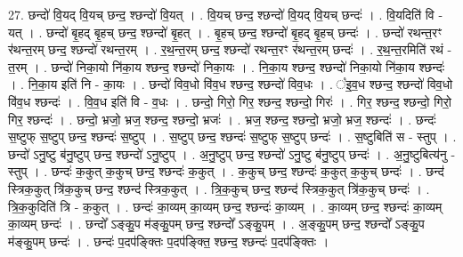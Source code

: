 \documentclass[17pt]{extarticle}
\begin{document}
27. छन्दो॑ वि॒यद् वि॒यच् छन्द॒ श्छन्दो॑ वि॒यत् । . वि॒यच् छन्द॒ श्छन्दो॑ वि॒यद् वि॒यच् छन्दः॑ । . वि॒यदिति॑ वि - यत् । . छन्दो॑ बृ॒हद् बृ॒हच् छन्द॒ श्छन्दो॑ बृ॒हत् । . बृ॒हच् छन्द॒ श्छन्दो॑ बृ॒हद् बृ॒हच् छन्दः॑ । . छन्दो॑ रथन्त॒रꣳ र॑थन्त॒रम् छन्द॒ श्छन्दो॑ रथन्त॒रम् । . र॒थ॒न्त॒रम् छन्द॒ श्छन्दो॑ रथन्त॒रꣳ र॑थन्त॒रम् छन्दः॑ । . र॒थ॒न्त॒रमिति॑ रथं - त॒रम् । . छन्दो॑ निका॒यो नि॑का॒य श्छन्द॒ श्छन्दो॑ निका॒यः । . नि॒का॒य श्छन्द॒ श्छन्दो॑ निका॒यो नि॑का॒य श्छन्दः॑ । . नि॒का॒य इति॑ नि - का॒यः । . छन्दो॑ विव॒धो वि॑व॒ध श्छन्द॒ श्छन्दो॑ विव॒धः । . ꣡इ॒व॒ध श्छन्द॒ श्छन्दो॑ विव॒धो वि॑व॒ध श्छन्दः॑ । . वि॒व॒ध इति॑ वि - व॒धः । . छन्दो॒ गिरो॒ गिर॒ श्छन्द॒ श्छन्दो॒ गिरः॑ । . गिर॒ श्छन्द॒ श्छन्दो॒ गिरो॒ गिर॒ श्छन्दः॑ । . छन्दो॒ भ्रजो॒ भ्रज॒ श्छन्द॒ श्छन्दो॒ भ्रजः॑ । . भ्रज॒ श्छन्द॒ श्छन्दो॒ भ्रजो॒ भ्रज॒ श्छन्दः॑ । . छन्दः॑ स॒ष्टुफ् स॒ष्टुप् छन्द॒ श्छन्दः॑ स॒ष्टुप् । . स॒ष्टुप् छन्द॒ श्छन्दः॑ स॒ष्टुफ् स॒ष्टुप् छन्दः॑ । . स॒ष्टुबिति॑ स - स्तुप् । . छन्दो॑ ऽनु॒ष्टु ब॑नु॒ष्टुप् छन्द॒ श्छन्दो॑ ऽनु॒ष्टुप् । . अ॒नु॒ष्टुप् छन्द॒ श्छन्दो॑ ऽनु॒ष्टु ब॑नु॒ष्टुप् छन्दः॑ । . अ॒नु॒ष्टुबित्य॑नु - स्तुप् । . छन्दः॑ क॒कुत् क॒कुच् छन्द॒ श्छन्दः॑ क॒कुत् । . क॒कुच् छन्द॒ श्छन्दः॑ क॒कुत् क॒कुच् छन्दः॑ । . छन्द॑ स्त्रिक॒कुत् त्रि॑क॒कुच् छन्द॒ श्छन्द॑ स्त्रिक॒कुत् । . त्रि॒क॒कुच् छन्द॒ श्छन्द॑ स्त्रिक॒कुत् त्रि॑क॒कुच् छन्दः॑ । . त्रि॒क॒कुदिति॑ त्रि - क॒कुत् । . छन्दः॑ का॒व्यम् का॒व्यम् छन्द॒ श्छन्दः॑ का॒व्यम् । . का॒व्यम् छन्द॒ श्छन्दः॑ का॒व्यम् का॒व्यम् छन्दः॑ । . छन्दो᳚ ऽङ्कु॒प म॑ङ्कु॒पम् छन्द॒ श्छन्दो᳚ ऽङ्कु॒पम् । . अ॒ङ्कु॒पम् छन्द॒ श्छन्दो᳚ ऽङ्कु॒प म॑ङ्कु॒पम् छन्दः॑ । . छन्दः॑ प॒दप॑ङ्क्तिः प॒दप॑ङ्क्ति॒ श्छन्द॒ श्छन्दः॑ प॒दप॑ङ्क्तिः । \newline
\end{document}
